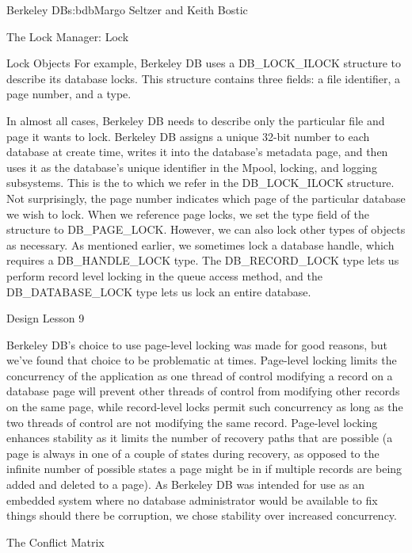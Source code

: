 \begin{aosachapter}{Berkeley DB}{s:bdb}{Margo Seltzer and Keith Bostic}
\begin{aosasect1}{The Lock Manager: Lock}
\begin{aosasect2}{Lock Objects}
For example, Berkeley DB uses a DB\_LOCK\_ILOCK structure to describe
its database locks. This structure contains three fields: a file
identifier, a page number, and a type.

In almost all cases, Berkeley DB needs to describe only the particular
file and page it wants to lock. Berkeley DB assigns a unique 32-bit
number to each database at create time, writes it into the database's
metadata page, and then uses it as the database's unique identifier
in the Mpool, locking, and logging subsystems. This is the
 to which we refer in the DB\_LOCK\_ILOCK structure. Not
surprisingly, the page number indicates which page of the particular
database we wish to lock.  When we reference page locks, we set the
type field of the structure to DB\_PAGE\_LOCK\@.  However, we can also
lock other types of objects as necessary. As mentioned earlier, we
sometimes lock a database handle, which requires a DB\_HANDLE\_LOCK
type. The DB\_RECORD\_LOCK type lets us perform record level locking
in the queue access method, and the DB\_DATABASE\_LOCK type lets us
lock an entire database. 
\hspace{-.5cm}
\begin{aosabox}{Design Lesson 9}

Berkeley DB's choice to use page-level locking was made for good
reasons, but we've found that choice to be problematic at times. Page-level locking
limits the concurrency of the application as one thread of control
modifying a record on a database page will prevent other threads of
control from modifying other records on the same page, while
record-level locks permit such concurrency as long as the two threads
of control are not modifying the same record.  Page-level locking
enhances stability as it limits the number of recovery paths that are
possible (a page is always in one of a couple of states during
recovery, as opposed to the infinite number of possible states a page
might be in if multiple records are being added and deleted to a
page). As Berkeley DB was intended for use as an embedded system where
no database administrator would be available to fix things should
there be corruption, we chose stability over increased concurrency.

\end{aosabox}

\end{aosasect2}

\begin{aosasect2}{The Conflict Matrix}


\end{aosasect2}
\end{aosasect1}
\end{aosachapter}
